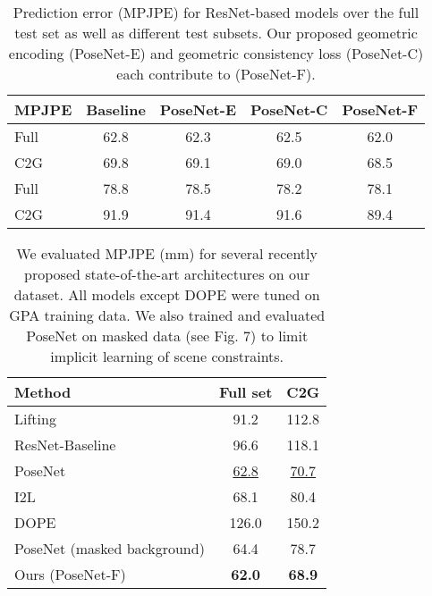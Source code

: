 \documentclass[times,referee,twocolumn,final,authoryear]{elsarticle}
\begin{document}
\begin{table}[t]
\begin{center}
\small
\begin{tabular}{l|c|c|c|c}
\hline
MPJPE & Baseline & PoseNet-E & PoseNet-C & PoseNet-F \\
\hline
Full & 62.8 & 62.3 &  62.5 & 62.0 \\
C2G & 69.8 & 69.1 & 69.0 & 68.5  \\
\hline
Full & 78.8 & 78.5 &  78.2 & 78.1 \\
C2G & 91.9 & 91.4 & 91.6 & 89.4  \\
\hline
\end{tabular}
\end{center}
\caption{Prediction error (MPJPE) for ResNet-based models over the full test set as
well as different test subsets. Our proposed geometric encoding (PoseNet-E) and geometric 
consistency loss (PoseNet-C) each contribute to (PoseNet-F).}
\label{table:mpjpe-posenet}
\end{table}





\begin{table}[t]
\begin{center}
\small
\begin{tabular}{l|c|c}
\hline
Method & Full set & C2G \\
\hline
Lifting \cite{simple} & 91.2  & 112.8\\
ResNet-Baseline \cite{Zhou_2017_ICCV} & 96.6 & 118.1\\
PoseNet \cite{rootnet} & \underline{62.8} &  \underline{70.7}\\ I2L \cite{Moon_2020_ECCV_I2L-MeshNet} &  68.1 & 80.4 \\ DOPE \cite{dope} &  126.0 & 150.2\\
\hline
PoseNet (masked background)  & 64.4 & 78.7\\
\hline
Ours (PoseNet-F) & \textbf{62.0}  & \textbf{68.9}\\
\hline
\end{tabular}
\end{center}
\caption{We evaluated MPJPE (mm) for several recently proposed state-of-the-art architectures on our dataset. All models except DOPE were tuned on GPA training data.  We also trained and evaluated PoseNet on masked data (see Fig. 7) to limit implicit learning of scene constraints.}
\label{table:otherSOTA}
\end{table}
\end{document}
